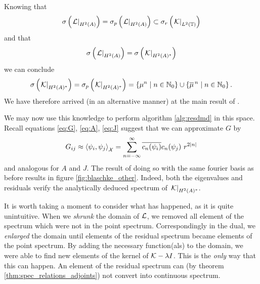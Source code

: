 Knowing that 
\begin{equation}
    \sigma \left( \left. \mathcal{L} \right|_{H^2 (A)} \right) = 
    \sigma_p \left( \left. \mathcal{L} \right|_{H^2 (A)} \right) \subset
    \sigma_r \left( \left. \mathcal{K} \right|_{L^2 (\mathbb{T})} \right)
\end{equation}
and that 
\begin{equation}
    \sigma \left( \left. \mathcal{L} \right|_{H^2 (A)} \right) = 
    \sigma \left( \left. \mathcal{K} \right|_{H^2 (A)^*} \right)
\end{equation}
we can conclude
\begin{equation}
    \sigma \left( \left. \mathcal{K} \right|_{H^2 (A)^*} \right) = 
    \sigma_p \left( \left. \mathcal{K} \right|_{H^2 (A)^*} \right) = 
    \left\{ \mu^n \mid n \in \mathbb{N}_0 \right\} \cup \left\{ \overline{\mu}^{\,n} \mid n \in \mathbb{N}_0 \right\} . 
\end{equation}
We have therefore arrived (in an alternative manner) at the main result of 
\cite{Slipantschuk2}. 

We may now use this knowledge to perform algorithm \ref{alg:resdmd} in this space. Recall 
equations \ref{eq:G}, \ref{eq:A}, \ref{eq:J} suggest that we can approximate 
$G$ by 
\begin{equation}
    G_{i j} \approx \left\langle \psi_i, \psi_j \right\rangle_\scrX
    = \sum_{n=-\infty}^{\infty} \overline{c_n (\psi_i)} c_n (\psi_j)\ r^{2 |n|} 
\end{equation}
and analogous for $A$ and $J$. The result of doing so with the same fourier basis 
as before results in figure \ref{fig:blaschke_other}. Indeed, both the eigenvalues and 
residuals verify the analytically deduced spectrum of $\left. \mathcal{K} \right|_{H^2 (A)^*}$. 

It is worth taking a moment to consider what has happened, as it is quite unintuitive. 
When we \emph{shrunk} the domain of $\mathcal{L}$, we removed all element of the spectrum which 
were not in the point spectrum. Correspondingly in the dual, we \emph{enlarged} the domain 
until elements of the residual spectrum became elements of the point spectrum. By adding 
the necessary function(als) to the domain, we were able to find new elements of the kernel 
of $\mathcal{K} - \lambda I$. This is the \emph{only} way that this can happen. An element of 
the residual spectrum can (by theorem \ref{thm:spec_relations_adjoints}) not convert into 
continuous spectrum. 

